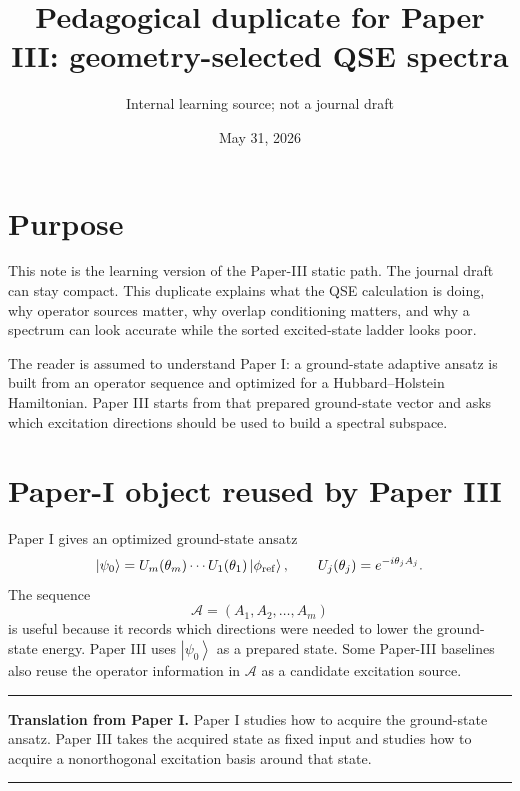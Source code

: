 \documentclass[10pt,twocolumn]{article}
\title{Pedagogical duplicate for Paper III: geometry-selected QSE spectra}
\author{Internal learning source; not a journal draft}
\date{May 31, 2026}
\newcommand{\ket}[1]{\left|#1\right\rangle}
\newenvironment{paperbox}{\par\smallskip\noindent\begin{center}\begin{minipage}{0.94\linewidth}\small\hrule\smallskip}{\smallskip\hrule\end{minipage}\end{center}\smallskip}
\begin{document}
\maketitle

\section*{Purpose}
This note is the learning version of the Paper-III static path.  The journal draft can stay compact.  This duplicate explains what the QSE calculation is doing, why operator sources matter, why overlap conditioning matters, and why a spectrum can look accurate while the sorted excited-state ladder looks poor.

The reader is assumed to understand Paper I: a ground-state adaptive ansatz is built from an operator sequence and optimized for a Hubbard--Holstein Hamiltonian.  Paper III starts from that prepared ground-state vector and asks which excitation directions should be used to build a spectral subspace.

\section{Paper-I object reused by Paper III}
Paper I gives an optimized ground-state ansatz
\begin{equation}
  \ket{\psi_0}
  = U_m(\theta_m)\cdots U_1(\theta_1)\ket{\phi_{\rm ref}},
  \qquad
  U_j(\theta_j)=e^{-i\theta_j A_j}.
\end{equation}
The sequence
\begin{equation}
  \mathcal A=(A_1,A_2,\ldots,A_m)
\end{equation}
is useful because it records which directions were needed to lower the ground-state energy.  Paper III uses \(\ket{\psi_0}\) as a prepared state.  Some Paper-III baselines also reuse the operator information in \(\mathcal A\) as a candidate excitation source.

\begin{paperbox}
\textbf{Translation from Paper I.}  Paper I studies how to acquire the ground-state ansatz.  Paper III takes the acquired state as fixed input and studies how to acquire a nonorthogonal excitation basis around that state.
\end{paperbox}
\end{document}
